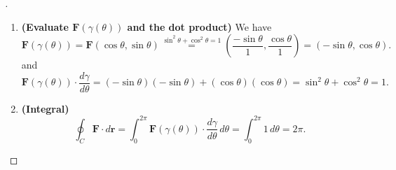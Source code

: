 \documentclass[11pt,openany]{article}
\renewcommand{\vec}[1]{\mathbf{#1}}
\begin{document}
\begin{proof}[\sol]
\begin{enumerate}
\begin{center}
\begin{minipage}{.4\textwidth}
	\end{minipage}
	\end{center}
	\item \textbf{(Evaluate $\textbf{F}(\gamma(\theta))$ and the dot product)}\; We have \[
	\vec{F}(\gamma(\theta)) = \vec{F}(\cos\theta,\sin\theta) \overset{\sin^2\theta+\cos^2\theta=1}{=} \left( \frac{-\sin \theta}{1}, \frac{\cos \theta}{1} \right)
	= (-\sin \theta, \cos \theta).
	\] and \[
	\vec{F}(\gamma(\theta)) \cdot \frac{d\gamma}{d\theta}
	= (-\sin \theta)(-\sin \theta) + (\cos \theta)(\cos \theta)
	= \sin^2 \theta + \cos^2 \theta = 1.
	\]
	\item \textbf{(Integral)} \[
	\oint_C \vec{F} \cdot d\vec{r}
	= \int_0^{2\pi} \vec{F}(\gamma(\theta)) \cdot\frac{d\gamma}{d\theta}\,d\theta
	= \int_0^{2\pi} 1\,d\theta = 2\pi.
	\]
\end{enumerate}
\end{proof}


\end{document}

